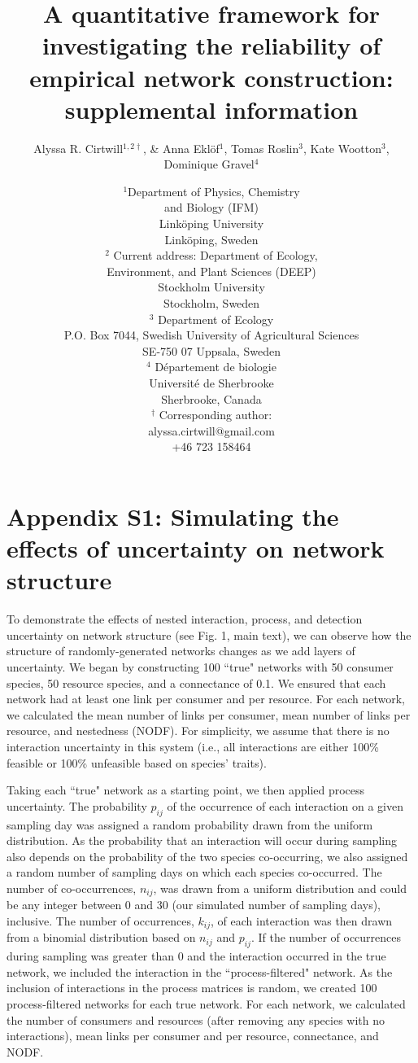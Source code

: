 \documentclass[12pt]{article}
\title{A quantitative framework for investigating the reliability of empirical network construction: supplemental information}
\author{Alyssa R. Cirtwill$^{1,2\dagger}$, \&  Anna Ekl\"{o}f$^{1}$, Tomas Roslin$^{3}$, Kate Wootton$^{3}$, Dominique Gravel$^{4}$}
\date{\small$^1$Department of Physics, Chemistry\\ 
and Biology (IFM)\\ 
Link\"{o}ping University\\
Link\"{o}ping, Sweden\\
\medskip $^2$
Current address: Department of Ecology,\\
Environment, and Plant Sciences (DEEP)\\
Stockholm University\\
Stockholm, Sweden\\
\medskip $^3$ Department of Ecology\\ P.O. Box 7044, Swedish University of Agricultural Sciences \\ SE-750 07 Uppsala, Sweden \\
\medskip$^4$ D\'{e}partement de biologie\\ 
Universit\'{e} de Sherbrooke\\ 
Sherbrooke, Canada\\ 
\medskip
$^\dagger$ Corresponding author:\\
alyssa.cirtwill@gmail.com\\
+46 723 158464\\
}
\begin{document}
 
\maketitle 
\raggedright
\setlength{\parindent}{15pt} 
\clearpage


\section*{Appendix S1: Simulating the effects of uncertainty on network structure}

  To demonstrate the effects of nested interaction, process, and detection uncertainty on network structure (see Fig. 1, main text), we can observe how the structure of randomly-generated networks changes as we add layers of uncertainty. We began by constructing 100 ``true" networks with 50 consumer species, 50 resource species, and a connectance of 0.1. We ensured that each network had at least one link per consumer and per resource. For each network, we calculated the mean number of links per consumer, mean number of links per resource, and nestedness (NODF). For simplicity, we assume that there is no interaction uncertainty in this system (i.e., all interactions are either 100\% feasible or 100\% unfeasible based on species' traits).


  Taking each ``true" network as a starting point, we then applied process uncertainty. The probability $p_{ij}$ of the occurrence of each interaction on a given sampling day was assigned a random probability drawn from the uniform distribution. As the probability that an interaction will occur during sampling also depends on the probability of the two species co-occurring, we also assigned a random number of sampling days on which each species co-occurred. The number of co-occurrences, $n_{ij}$, was drawn from a uniform distribution and could be any integer between 0 and 30 (our simulated number of sampling days), inclusive. The number of occurrences, $k_{ij}$, of each interaction was then drawn from a binomial distribution based on $n_{ij}$ and $p_{ij}$. If the number of occurrences during sampling was greater than 0 and the interaction occurred in the true network, we included the interaction in the ``process-filtered" network. As the inclusion of interactions in the process matrices is random, we created 100 process-filtered networks for each true network. For each network, we calculated the number of consumers and resources (after removing any species with no interactions), mean links per consumer and per resource, connectance, and NODF.
\end{document}
